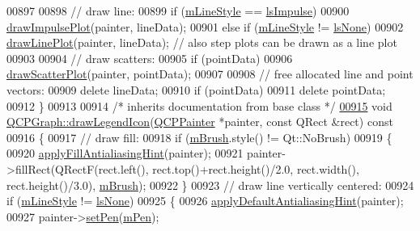 \begin{DoxyCode}
00897   
00898   \textcolor{comment}{// draw line:}
00899   \textcolor{keywordflow}{if} (\hyperlink{a00031_a8604fd98402035a63375849f7341ee25}{mLineStyle} == \hyperlink{a00031_ad60175cd9b5cac937c5ee685c32c0859aa3b358b4ae7cca94aceeb8e529c12ebb}{lsImpulse})
00900     \hyperlink{a00031_abc01180629621f1e47e94559227d3d8c}{drawImpulsePlot}(painter, lineData);
00901   \textcolor{keywordflow}{else} \textcolor{keywordflow}{if} (\hyperlink{a00031_a8604fd98402035a63375849f7341ee25}{mLineStyle} != \hyperlink{a00031_ad60175cd9b5cac937c5ee685c32c0859aea9591b933733cc7b20786b71e60fa04}{lsNone})
00902     \hyperlink{a00031_acebc22c3385829b19a87e6281fe6ade2}{drawLinePlot}(painter, lineData); \textcolor{comment}{// also step plots can be drawn as a line plot}
00903   
00904   \textcolor{comment}{// draw scatters:}
00905   \textcolor{keywordflow}{if} (pointData)
00906     \hyperlink{a00031_af1872a60bed7acb3f3b17bfae3f4764c}{drawScatterPlot}(painter, pointData);
00907   
00908   \textcolor{comment}{// free allocated line and point vectors:}
00909   \textcolor{keyword}{delete} lineData;
00910   \textcolor{keywordflow}{if} (pointData)
00911     \textcolor{keyword}{delete} pointData;
00912 \}
00913 
00914 \textcolor{comment}{/* inherits documentation from base class */}
\hypertarget{a00115_source_l00915}{}\hyperlink{a00031_a9a1a3d937a35368c421657860aa5a173}{00915} \textcolor{keywordtype}{void} \hyperlink{a00031_a9a1a3d937a35368c421657860aa5a173}{QCPGraph::drawLegendIcon}(\hyperlink{a00047}{QCPPainter} *painter, \textcolor{keyword}{const} QRect &rect)\textcolor{keyword}{
       const}
00916 \textcolor{keyword}{}\{
00917   \textcolor{comment}{// draw fill:}
00918   \textcolor{keywordflow}{if} (\hyperlink{a00024_a33f00674c0161c13315ab9da0895418e}{mBrush}.style() != Qt::NoBrush)
00919   \{
00920     \hyperlink{a00024_ac08a480155895e674dbfe5a5670e0ff3}{applyFillAntialiasingHint}(painter);
00921     painter->fillRect(QRectF(rect.left(), rect.top()+rect.height()/2.0, rect.width(), rect.height()/3.0), 
      \hyperlink{a00024_a33f00674c0161c13315ab9da0895418e}{mBrush});
00922   \}
00923   \textcolor{comment}{// draw line vertically centered:}
00924   \textcolor{keywordflow}{if} (\hyperlink{a00031_a8604fd98402035a63375849f7341ee25}{mLineStyle} != \hyperlink{a00031_ad60175cd9b5cac937c5ee685c32c0859aea9591b933733cc7b20786b71e60fa04}{lsNone})
00925   \{
00926     \hyperlink{a00024_a76e9d6cc7972dc1528f526d163766aca}{applyDefaultAntialiasingHint}(painter);
00927     painter->\hyperlink{a00047_af9c7a4cd1791403901f8c5b82a150195}{setPen}(\hyperlink{a00024_a67bc0622fd1b9fa14e54c14922dcec66}{mPen});

\end{DoxyCode}
